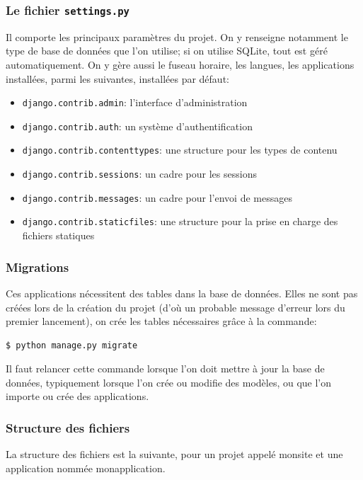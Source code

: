\documentclass[a4paper, 10pt]{article}
\begin{document}
\subsubsection{Le fichier \texttt{settings.py}}
Il comporte les principaux paramètres du projet. On y renseigne notamment le type de base de données que l'on utilise; si on utilise SQLite, tout est géré automatiquement. On y gère aussi le fuseau horaire, les langues, les applications installées, parmi les suivantes, installées par défaut:
\begin{itemize}
	\item \texttt{django.contrib.admin}: l'interface d'administration
	\item \texttt{django.contrib.auth}: un système d'authentification
	\item \texttt{django.contrib.contenttypes}: une structure pour les types de contenu
	\item \texttt{django.contrib.sessions}: un cadre pour les sessions
	\item \texttt{django.contrib.messages}: un cadre pour l'envoi de messages
	\item \texttt{django.contrib.staticfiles}: une structure pour la prise en charge des fichiers statiques
\end{itemize}

\subsubsection{Migrations}

Ces applications nécessitent des tables dans la base de données. Elles ne sont pas créées lors de la création du projet (d'où un probable message d'erreur lors du premier lancement), on crée les tables nécessaires grâce à la commande:
\begin{verbatim}
$ python manage.py migrate
\end{verbatim}

Il faut relancer cette commande lorsque l'on doit mettre à jour la base de données, typiquement lorsque l'on crée ou modifie des modèles, ou que l'on importe ou crée des applications.

\subsubsection{Structure des fichiers}
La structure des fichiers est la suivante, pour un projet appelé monsite et une application nommée monapplication.
\end{document}
